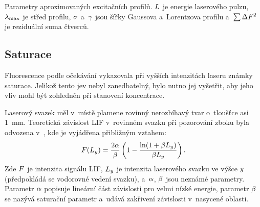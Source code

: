 \shorthandoff{-}
\begin{table}[bh]
	\centering
	\caption{Parametry aproximovaných excitačních profilů.
		$L$ je energie laserového pulzu,
		$\lambda_\mathrm{max}$ je střed profilu,
		$\sigma$ a~$\gamma$ jsou šířky Gaussova a~Lorentzova profilu
		a~$\sum\Delta F^{2}$ je reziduální suma čtverců.}
	\label{tab:lif-excitprof-fit}
\end{table}
\shorthandon{-}

\subsection{Saturace}
\label{sec:lif-saturation}
Fluorescence podle očekávání vykazovala při vyšších intenzitách laseru
znám\-ky saturace.
Jelikož tento jev nebyl zanedbatelný, bylo nutno jej vyšetřit,
aby jeho vliv mohl být zohledněn při stanovení koncentrace.

Laserový svazek měl v~místě plamene rovinný nerozbíhavý tvar
o~tloušťce asi \SI{1}{\milli\metre}.
Teoretická závislost LIF v~rovinném svazku při pozorování zboku
byla odvozena v~\cite{lif-pb}, kde je vyjádřena přibližným vztahem:
\begin{equation}
	\label{eq:lif-saturation}
	F(L_y) = \frac{2\alpha}{\beta}
	\left( 1 - \frac{\ln(1 + \beta L_y)}{\beta L_y} \right).
\end{equation}
Zde $F$ je intenzita signálu LIF,
$L_y$ je intenzita laserového svazku ve výšce $y$
(předpokládá se vodorovné vedení svazku),
a~$\alpha$, $\beta$ jsou neznámé parametry.
Parametr $\alpha$ popisuje lineární část závislosti pro velmi nízké energie,
parametr $\beta$ se nazývá saturační parametr a~udává zakřivení
závislosti v~nasycené oblasti.

